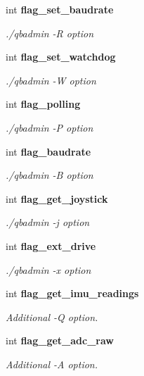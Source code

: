 \begin{DoxyCompactItemize}
int \textbf{ flag\+\_\+set\+\_\+baudrate}
\begin{DoxyCompactList}\small\item\em ./qbadmin -\/R option \end{DoxyCompactList}\item 
\mbox{\label{structglobal__args_a5416bb93d203c57a7fc6fe93957f5c14}} 
int \textbf{ flag\+\_\+set\+\_\+watchdog}
\begin{DoxyCompactList}\small\item\em ./qbadmin -\/W option \end{DoxyCompactList}\item 
\mbox{\label{structglobal__args_ab4fab167b07a819ebd9cdff9d9c232b0}} 
int \textbf{ flag\+\_\+polling}
\begin{DoxyCompactList}\small\item\em ./qbadmin -\/P option \end{DoxyCompactList}\item 
\mbox{\label{structglobal__args_a9781d8e86f2d0d0414d313fec085d20e}} 
int \textbf{ flag\+\_\+baudrate}
\begin{DoxyCompactList}\small\item\em ./qbadmin -\/B option \end{DoxyCompactList}\item 
\mbox{\label{structglobal__args_a58c1425e6d892db3e470cdd99529fce0}} 
int \textbf{ flag\+\_\+get\+\_\+joystick}
\begin{DoxyCompactList}\small\item\em ./qbadmin -\/j option \end{DoxyCompactList}\item 
\mbox{\label{structglobal__args_a5cc1e4efdeddb5e75d5e733f00e5087f}} 
int \textbf{ flag\+\_\+ext\+\_\+drive}
\begin{DoxyCompactList}\small\item\em ./qbadmin -\/x option \end{DoxyCompactList}\item 
\mbox{\label{structglobal__args_a43a4a1817ad42b44cedb85fc01d61953}} 
int \textbf{ flag\+\_\+get\+\_\+imu\+\_\+readings}
\begin{DoxyCompactList}\small\item\em Additional -\/Q option. \end{DoxyCompactList}\item 
\mbox{\label{structglobal__args_a1f18f97485af119b78206a43019463ec}} 
int \textbf{ flag\+\_\+get\+\_\+adc\+\_\+raw}
\begin{DoxyCompactList}\small\item\em Additional -\/A option. \end{DoxyCompactList}\item 

\end{DoxyCompactItemize}

